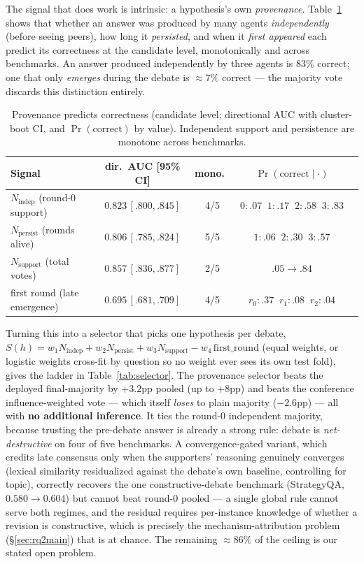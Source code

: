 The signal that does work is intrinsic: a hypothesis's own \emph{provenance}. Table~\ref{tab:prov}
shows that whether an answer was produced by many agents \emph{independently} (before seeing peers),
how long it \emph{persisted}, and when it \emph{first appeared} each predict its correctness at the
candidate level, monotonically and across benchmarks. An answer produced independently by three agents
is $83\%$ correct; one that only \emph{emerges} during the debate is $\approx 7\%$ correct --- the
majority vote discards this distinction entirely.

\begin{table}[t]
\centering\small
\caption{Provenance predicts correctness (candidate level; directional AUC with cluster-boot CI, and
$\Pr(\text{correct})$ by value). Independent support and persistence are monotone across benchmarks.}
\label{tab:prov}
\begin{tabular}{lcccl}
\toprule
Signal & dir.\ AUC [95\% CI] & mono.\ & $\Pr(\text{correct}\mid\cdot)$ \\
\midrule
$N_{\mathrm{indep}}$ (round-0 support) & $0.823\,[.800,.845]$ & 4/5 & $0{:}.07\;\;1{:}.17\;\;2{:}.58\;\;3{:}.83$ \\
$N_{\mathrm{persist}}$ (rounds alive)  & $0.806\,[.785,.824]$ & 5/5 & $1{:}.06\;\;2{:}.30\;\;3{:}.57$ \\
$N_{\mathrm{support}}$ (total votes)   & $0.857\,[.836,.877]$ & 2/5 & $.05 \rightarrow .84$ \\
first round (late emergence)           & $0.695\,[.681,.709]$ & 4/5 & $r_0{:}.37\;\;r_1{:}.08\;\;r_2{:}.04$ \\
\bottomrule
\end{tabular}
\end{table}

Turning this into a selector that picks one hypothesis per debate,
$S(h)=w_1 N_{\mathrm{indep}}+w_2 N_{\mathrm{persist}}+w_3 N_{\mathrm{support}}-w_4\,\mathrm{first\_round}$
(equal weights, or logistic weights cross-fit by question so no weight ever sees its own test fold),
gives the ladder in Table~\ref{tab:selector}. The provenance selector beats the deployed final-majority
by $+3.2$pp pooled (up to $+8$pp) and beats the conference influence-weighted vote --- which itself
\emph{loses} to plain majority ($-2.6$pp) --- all with \textbf{no additional inference}. It ties the
round-0 independent majority, because trusting the pre-debate answer is already a strong rule: debate
is \emph{net-destructive} on four of five benchmarks. A convergence-gated variant, which credits late
consensus only when the supporters' reasoning genuinely converges (lexical similarity residualized
against the debate's own baseline, controlling for topic), correctly recovers the one
constructive-debate benchmark (StrategyQA, $0.580\!\to\!0.604$) but cannot beat round-0 pooled --- a
single global rule cannot serve both regimes, and the residual requires per-instance knowledge of
whether a revision is constructive, which is precisely the mechanism-attribution problem
(\S\ref{sec:rq2main}) that is at chance. The remaining $\approx 86\%$ of the ceiling is our stated open
problem.

